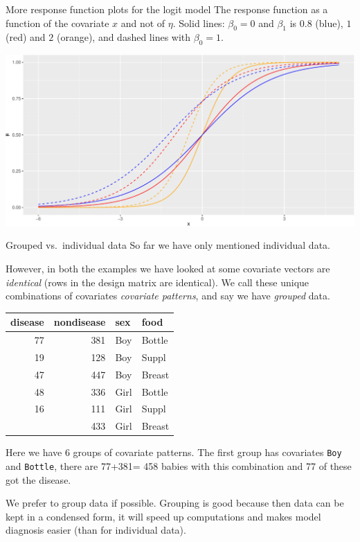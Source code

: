 \documentclass[
  ignorenonframetext,
]{beamer}
\begin{document}
\begin{frame}
\begin{block}{More response function plots for the logit model}
\label{more-response-function-plots-for-the-logit-model}
The response function as a function of the covariate \(x\) and not of
\(\eta\). Solid lines: \(\beta_0=0\) and \(\beta_1\) is \(0.8\) (blue),
\(1\) (red) and \(2\) (orange), and dashed lines with \(\beta_0=1\).

\includegraphics{Module03PresentationWeek1_files/figure-beamer/unnamed-chunk-10-1.pdf}
\end{block}
\end{frame}

\begin{frame}{Grouped vs.~individual data}
\label{grouped-vs.-individual-data}
So far we have only mentioned individual data.

However, in both the examples we have looked at some covariate vectors
are \emph{identical} (rows in the design matrix are identical). We call
these unique combinations of covariates \emph{covariate patterns}, and
say we have \emph{grouped} data.

\begin{longtable}[t]{rrll}
\toprule
disease & nondisease & sex & food\\
\midrule
77 & 381 & Boy & Bottle\\
19 & 128 & Boy & Suppl\\
47 & 447 & Boy & Breast\\
48 & 336 & Girl & Bottle\\
16 & 111 & Girl & Suppl\\
\addlinespace
31 & 433 & Girl & Breast\\
\bottomrule
\end{longtable}
\end{frame}

\begin{frame}[fragile]
Here we have 6 groups of covariate patterns. The first group has
covariates \texttt{Boy} and \texttt{Bottle}, there are 77+381= 458
babies with this combination and 77 of these got the disease.

We prefer to group data if possible. Grouping is good because then data
can be kept in a condensed form, it will speed up computations and makes
model diagnosis easier (than for individual data).
\end{frame}
\end{document}
